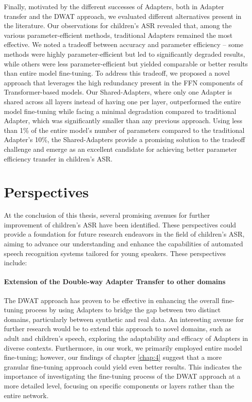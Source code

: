 Finally, motivated by the different successes of Adapters, both in Adapter transfer and the DWAT approach, we evaluated different alternatives present in the literature. Our observations for children's ASR revealed that, among the various parameter-efficient methods, traditional Adapters remained the most effective. We noted a tradeoff between accuracy and parameter efficiency – some methods were highly parameter-efficient but led to significantly degraded results, while others were less parameter-efficient but yielded comparable or better results than entire model fine-tuning. To address this tradeoff, we proposed a novel approach that leverages the high redundancy present in the FFN components of Transformer-based models. Our Shared-Adapters, where only one Adapter is shared across all layers instead of having one per layer, outperformed the entire model fine-tuning while facing a minimal degradation compared to traditional Adapter, which was significantly smaller than any previous approach. Using less than 1\% of the entire model's number of parameters compared to the traditional Adapter's 10\%, the Shared-Adapters provide a promising solution to the tradeoff challenge and emerge as an excellent candidate for achieving better parameter efficiency transfer in children's ASR.

\section{Perspectives}
At the conclusion of this thesis, several promising avenues for further improvement of children's ASR have been identified. These perspectives could provide a foundation for future research endeavors in the field of children's ASR, aiming to advance our understanding and enhance the capabilities of automated speech recognition systems tailored for young speakers. These perspectives include:

\paragraph*{Extension of the Double-way Adapter Transfer to other domains} The DWAT approach has proven to be effective in enhancing the overall fine-tuning process by using Adapters to bridge the gap between two distinct domains, particularly between synthetic and real data. An interesting avenue for further research would be to extend this approach to novel domains, such as adult and children's speech, exploring the adaptability and efficacy of Adapters in diverse contexts. Furthermore, in our work, we primarily employed entire model fine-tuning; however, our findings of chapter \ref{chap:4} suggest that a more granular fine-tuning approach could yield even better results. This indicates the importance of investigating the fine-tuning process of the DWAT approach at a more detailed level, focusing on specific components or layers rather than the entire network. 

